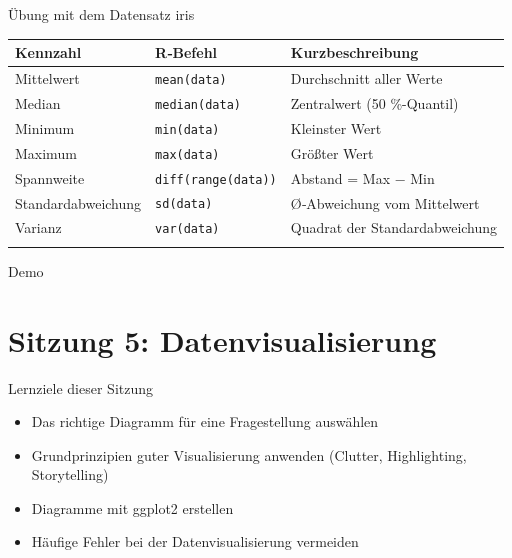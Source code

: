 \documentclass[
  ignorenonframetext,
]{beamer}
\newcounter{none} %
\providecommand{\tightlist}{%
  \setlength{\itemsep}{0pt}\setlength{\parskip}{0pt}}
\begin{document}
\begin{frame}[fragile]{Übung mit dem Datensatz iris}
\protect{}\label{uxfcbung-mit-dem-datensatz-iris}
{\def\LTcaptype{none} %
\begin{longtable}[]{@{}
  >{\raggedright\arraybackslash}p{}
  >{\raggedright\arraybackslash}p{}
  >{\raggedright\arraybackslash}p{}@{}}
\toprule\noalign{}
\begin{minipage}[b]{\linewidth}\raggedright
Kennzahl
\end{minipage} & \begin{minipage}[b]{\linewidth}\raggedright
R‑Befehl
\end{minipage} & \begin{minipage}[b]{\linewidth}\raggedright
Kurzbeschreibung
\end{minipage} \\
\midrule\noalign{}
\endhead
Mittelwert & \texttt{mean(data)} & Durchschnitt aller Werte \\
Median & \texttt{median(data)} & Zentralwert (50 \%-Quantil) \\
Minimum & \texttt{min(data)} & Kleinster Wert \\
Maximum & \texttt{max(data)} & Größter Wert \\
Spannweite & \texttt{diff(range(data))} & Abstand = Max − Min \\
Standardabweichung & \texttt{sd(data)} & Ø‑Abweichung vom Mittelwert \\
Varianz & \texttt{var(data)} & Quadrat der Standardabweichung \\
\bottomrule\noalign{}
\end{longtable}
}
\end{frame}

\begin{frame}{Demo}
\protect{}\label{demo-1}
\end{frame}

\section{Sitzung 5:
Datenvisualisierung}\label{sitzung-5-datenvisualisierung}

\begin{frame}{Lernziele dieser Sitzung}
\protect{}\label{lernziele-dieser-sitzung-3}
\begin{itemize}
\tightlist
\item
  Das richtige Diagramm für eine Fragestellung auswählen
\item
  Grundprinzipien guter Visualisierung anwenden (Clutter, Highlighting,
  Storytelling)
\item
  Diagramme mit ggplot2 erstellen
\item
  Häufige Fehler bei der Datenvisualisierung vermeiden
\end{itemize}
\end{frame}
\end{document}
